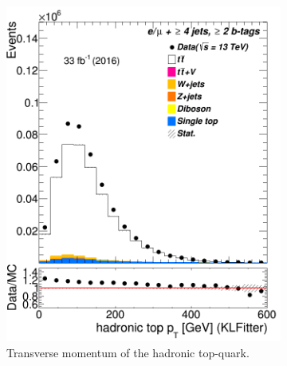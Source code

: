 \begin{figure} %
	\centering
	\begin{subfigure}{0.35\textwidth}
		\includegraphics[width=\linewidth]{ControlPlots_emujets_2016_4incl_2incl/klf_topHad_pt_emujets_2016.png}
		\caption{Transverse momentum of the hadronic top-quark.} \label{fig:23}
	\end{subfigure}
	\hspace*{1.5cm}
	\begin{subfigure}{0.35\textwidth}

\end{subfigure}
\end{figure}
